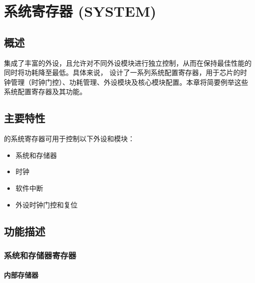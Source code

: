\documentclass[main\_\_CN.tex]{subfiles}
\begin{document}

\ifglobal
\else
    {\let\clearpage\relax \listoftodos}
    {\let\clearpage\relax \listofdonetodos}
    \tableofcontents
\fi



\chapter{系统寄存器 (SYSTEM)}
\label{mod:sysreg}
\hypertarget{sysreg}{}

\section{概述}

\chipname{} 集成了丰富的外设，且允许对不同外设模块进行独立控制，从而在保持最佳性能的同时将功耗降至最低。具体来说，\chipname{} 设计了一系列系统配置寄存器，用于芯片的时钟管理（时钟门控）、功耗管理、外设模块及核心模块配置。本章将简要例举这些系统配置寄存器及其功能。

\section{主要特性}

\chipname{} 的系统寄存器可用于控制以下外设和模块：

\begin{itemize}
    \item 系统和存储器
    \item 时钟
    \item 软件中断
    \item 外设时钟门控和复位
\end{itemize}


\section{功能描述}

\subsection{系统和存储器寄存器}

\subsubsection{内部存储器}
\end{document}
